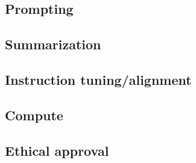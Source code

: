 \documentclass{article}
\begin{document}

\subsection{Prompting}\label{sec:prompting}


\subsection{Summarization}\label{sec:summarization}

\subsection{Instruction tuning/alignment}\label{sec:instruction_tuning_alignment}

\subsection{Compute}\label{sec:compute}

\subsection{Ethical approval}\label{sec:ethical_approval}
\end{document}
